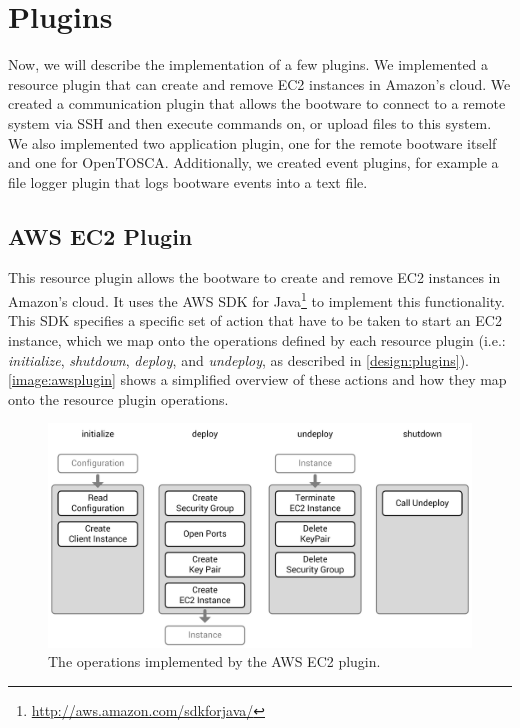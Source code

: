 \section{Plugins}
\label{implementation:plugins}

Now, we will describe the implementation of a few plugins.
We implemented a resource plugin that can create and remove EC2 instances in Amazon's cloud.
We created a communication plugin that allows the bootware to connect to a remote system via SSH and then execute commands on, or upload files to this system.
We also implemented two application plugin, one for the remote bootware itself and one for OpenTOSCA.
Additionally, we created event plugins, for example a file logger plugin that logs bootware events into a text file.

\subsection{AWS EC2 Plugin}

This resource plugin allows the bootware to create and remove EC2 instances in Amazon's cloud.
It uses the AWS SDK for Java\footnote{\url{http://aws.amazon.com/sdkforjava/}} to implement this functionality.
This SDK specifies a specific set of action that have to be taken to start an EC2 instance, which we map onto the operations defined by each resource plugin (i.e.: \textit{initialize}, \textit{shutdown}, \textit{deploy}, and \textit{undeploy}, as described in \autoref{design:plugins}).
\autoref{image:awsplugin} shows a simplified overview of these actions and how they map onto the resource plugin operations.

\begin{figure}[!htbp]
	\centering
	\includegraphics[resolution=600]{implementation/assets/aws_plugin}
	\caption{The operations implemented by the AWS EC2 plugin.}
	\label{image:awsplugin}
\end{figure}

